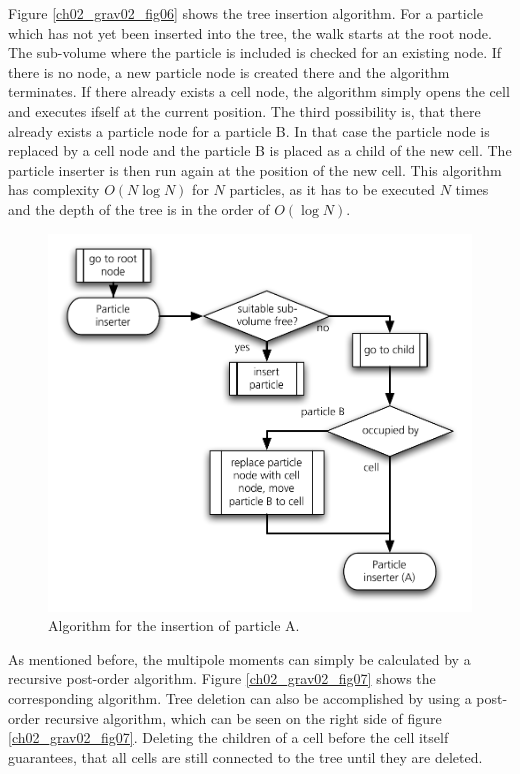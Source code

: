 Figure \ref{ch02_grav02_fig06} shows the tree insertion algorithm. For a particle which has not yet  been inserted into the tree, the walk starts at the root node. The sub-volume where the particle is included is checked for an existing node. If there is no node, a new particle node is created there and the algorithm terminates. If there already exists a cell node, the algorithm simply opens the cell and executes ifself at the current position. The third possibility is, that there already exists a particle node for a particle B. In that case the particle node is replaced by a cell node and the particle B is placed as a child of the new cell. The particle inserter is then run again at the position of the new cell. This algorithm has complexity $O(N \log{N})$ for $N$ particles, as it has to be executed $N$ times and the depth of the tree is in the order of $O(\log{N})$.
\begin{figure}[htbp]
\begin{center}
\includegraphics[scale=0.6]{13algo_particle_insert.pdf}
\caption{Algorithm for the insertion of particle A.}
\label{ch02_fig13}
\end{center}
\end{figure}

As mentioned before, the multipole moments can simply be calculated by a recursive post-order algorithm. Figure \ref{ch02_grav02_fig07} shows the corresponding algorithm. Tree deletion can also be accomplished by using a post-order recursive algorithm, which can be seen on the right side of figure \ref{ch02_grav02_fig07}. Deleting the children of a cell before the cell itself guarantees, that all cells are still connected to the tree until they are deleted.


